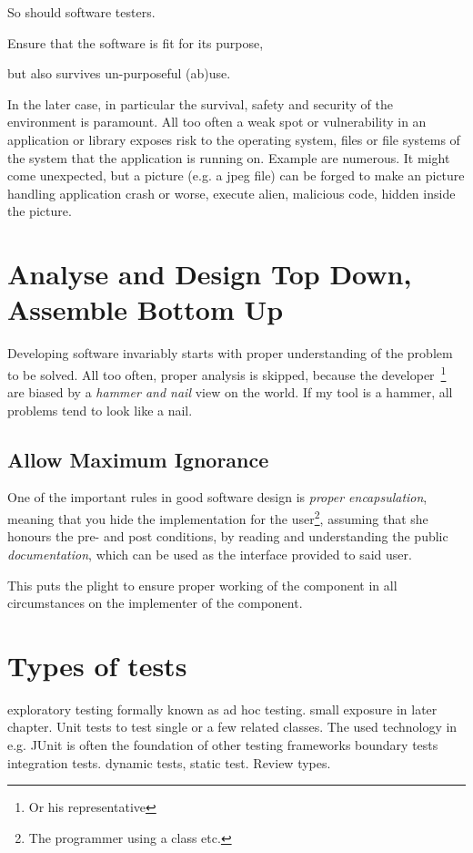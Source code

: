 \documentclass[\docroot/main]{subfiles}
\begin{document}
So should software testers. 
\begin{itemize*}
\item Ensure that the software is fit for its purpose,
\item but also survives un-purposeful (ab)use.
\end{itemize*}
In the later case, in particular the survival, safety and security of the environment is
paramount. All too often a weak spot or vulnerability in an
application or library exposes risk to the operating system, files or
file systems of the system that the application is running on. Example are
numerous. It might come unexpected, but a picture (e.g. a jpeg file)
can be forged to make an picture handling application crash or worse, execute alien, malicious code, hidden inside the picture.

\section{Analyse and Design Top Down, Assemble Bottom Up}
Developing software invariably starts with proper understanding of the problem to be solved.
All too often, proper analysis is skipped, because the developer~\footnote{Or his representative} are biased by a \textit{hammer and nail} view on the world. If my tool is a hammer, all problems tend to look like a nail.

\subsection{Allow Maximum Ignorance}
One of the important rules in good software design is \textit{proper
encapsulation}, meaning that you hide the implementation for the
user\footnote{The programmer using a class etc.}, assuming that she
honours the pre- and post conditions, by reading and understanding the
public \textit{documentation}, which can be used as the interface
provided to said user.

This puts the plight to ensure proper working of the component in all
circumstances on the implementer of the component.

\section{Types of tests}

exploratory testing formally known as ad hoc testing.
small exposure in later chapter.
Unit tests to test single or a few related classes. The used
technology in e.g. JUnit  is often the foundation of other testing frameworks
boundary tests
integration tests.
dynamic tests, static test.
Review types.
\end{document}
